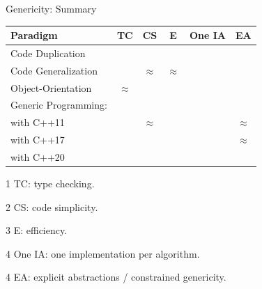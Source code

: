 \documentclass[12pt,aspectratio=169]{beamer}
\newcommand{\cmark}{\textcolor{green!50!white}{\ding{51}}}%
\newcommand{\xmark}{\textcolor{red!50!white}{\ding{55}}}%
\newcommand{\eqmark}{{\bf \(\approx\)}}
\begin{document}
\begin{frame}[fragile]{Genericity: Summary}
  \begin{table}[htbp]
    \centering
    \small
    \begin{threeparttable}
      \begin{tabular}[width=0.8\linewidth]{l|ccccc}
        Paradigm             & TC\tnote{1} & CS\tnote{2} & E\tnote{3} & One IA\tnote{4} & EA\tnote{5} \\
        \hline
        Code Duplication     & \cmark      & \xmark      & \cmark     & \xmark          & \xmark      \\
        Code Generalization  & \xmark      & \eqmark     & \eqmark    & \cmark          & \xmark      \\
        Object-Orientation   & \eqmark     & \cmark      & \xmark     & \cmark          & \cmark      \\
        Generic Programming: &             &             &            &                 &             \\
        \quad with C++11     & \cmark      & \eqmark     & \cmark     & \cmark          & \eqmark     \\
        \quad with C++17     & \cmark      & \cmark      & \cmark     & \cmark          & \eqmark     \\
        \quad with C++20     & \cmark      & \cmark      & \cmark     & \cmark          & \cmark      \\
      \end{tabular}
      \begin{tablenotes}
        \item[1] TC: type checking.
        \item[2] CS: code simplicity.
        \item[3] E: efficiency.
        \item[4] One IA: one implementation per algorithm.
        \item[4] EA: explicit abstractions / constrained genericity.
      \end{tablenotes}
      \label{table:gen.approaches}
    \end{threeparttable}
  \end{table}
\end{frame}
\end{document}
